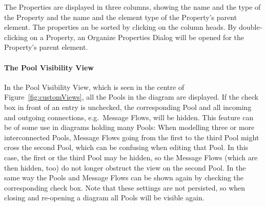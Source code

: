 The Properties are displayed in three columns, showing the name and the type of the Property and the name and the element type of the Property's parent element. The properties an be sorted by clicking on the column heads.  By double-clicking on a Property, an Organize Properties Dialog will be opened for the Property's parent element.


\paragraph*{The Pool Visibility View}

In the Pool Visibility View, which is seen in the centre of Figure~\ref{fig:customViews}, all the Pools in the diagram are displayed.  If the check box in front of an entry is unchecked, the corresponding Pool and all incoming and outgoing connections, e.g.\ Message Flows, will be hidden.  This feature can be of some use in diagrams holding many Pools:  When modelling three or more interconnected Pools, Message Flows going from the first to the third Pool might cross the second Pool, which can be confusing when editing that Pool.  In this case, the first or the third Pool may be hidden, so the Message Flows (which are then hidden, too) do not longer obstruct the view on the second Pool.  In the same way the Pools and Message Flows can be shown again by checking the corresponding check box.  Note that these settings are not persisted, so when closing and re-opening a diagram all Pools will be visible again.  %





